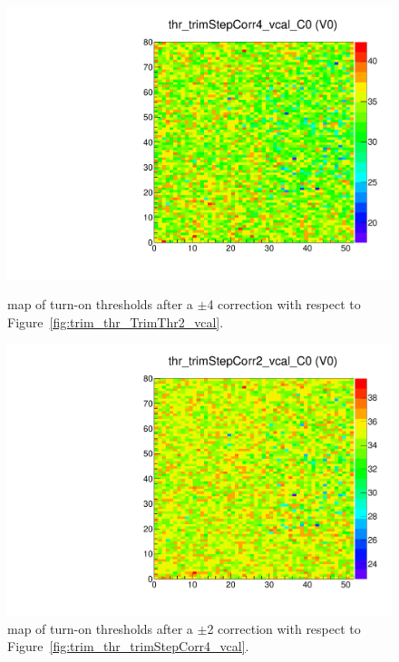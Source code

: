 \begin{figure}[!htp]
\centering
\begin{minipage}{0.45\textwidth}
  \includegraphics[width=1.0\textwidth]{figures/trim_thr_trimStepCorr4_vcal.pdf}
  \caption{\roc map of \vcal turn-on thresholds after a \trimbits$\pm$4 correction with respect to Figure~\ref{fig:trim_thr_TrimThr2_vcal}.}
  \label{fig:trim_thr_trimStepCorr4_vcal}
\end{minipage}
\hspace{0.3cm}
\begin{minipage}{0.45\textwidth}
  \includegraphics[width=1.0\textwidth]{figures/trim_thr_trimStepCorr2_vcal.pdf}
  \caption{\roc map of \vcal turn-on thresholds after a \trimbits$\pm$2 correction with respect to Figure~\ref{fig:trim_thr_trimStepCorr4_vcal}.}
  \label{fig:trim_thr_trimStepCorr2_vcal}
\end{minipage}
\end{figure}

